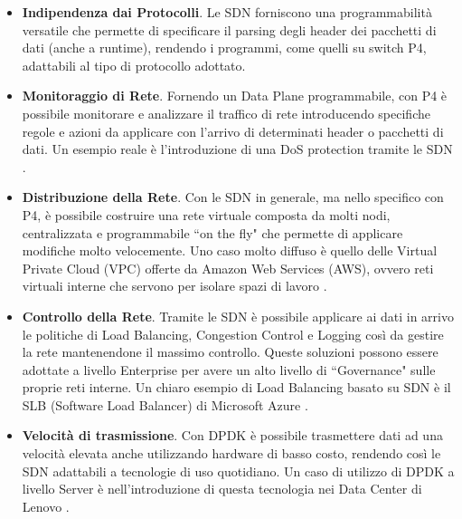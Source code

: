 \begin{itemize}
    \item \textbf{Indipendenza dai Protocolli}. Le SDN forniscono una programmabilità versatile che permette di specificare il parsing degli header dei pacchetti di dati (anche a runtime), rendendo i programmi, come quelli su switch P4, adattabili al tipo di protocollo adottato.
    \item \textbf{Monitoraggio di Rete}. Fornendo un Data Plane programmabile, con P4 è possibile monitorare e analizzare il traffico di rete introducendo specifiche regole e azioni da applicare con l'arrivo di determinati header o pacchetti di dati. Un esempio reale è l'introduzione di una DoS protection tramite le SDN \cite{navid_detection_2017}.
    \item \textbf{Distribuzione della Rete}. Con le SDN in generale, ma nello specifico con P4, è possibile costruire una rete virtuale composta da molti nodi, centralizzata e programmabile ``on the fly" che permette di applicare modifiche molto velocemente. Uno caso molto diffuso è quello delle Virtual Private Cloud (VPC) offerte da Amazon Web Services (AWS), ovvero reti virtuali interne che servono per isolare spazi di lavoro \cite{noauthor_aws_sdn}.
    \item \textbf{Controllo della Rete}. Tramite le SDN è possibile applicare ai dati in arrivo le politiche di Load Balancing, Congestion Control e Logging così da gestire la rete mantenendone il massimo controllo. Queste soluzioni possono essere adottate a livello Enterprise per avere un alto livello di ``Governance" sulle proprie reti interne. Un chiaro esempio di Load Balancing basato su SDN è il SLB (Software Load Balancer) di Microsoft Azure \cite{noauthor_azure_sdn}.
    \item \textbf{Velocità di trasmissione}. Con DPDK è possibile trasmettere dati ad una velocità elevata anche utilizzando hardware di basso costo, rendendo così le SDN adattabili a tecnologie di uso quotidiano. Un caso di utilizzo di DPDK a livello Server è nell'introduzione di questa tecnologia nei Data Center di Lenovo \cite{noauthor_lenovo_sdn}.
\end{itemize}





